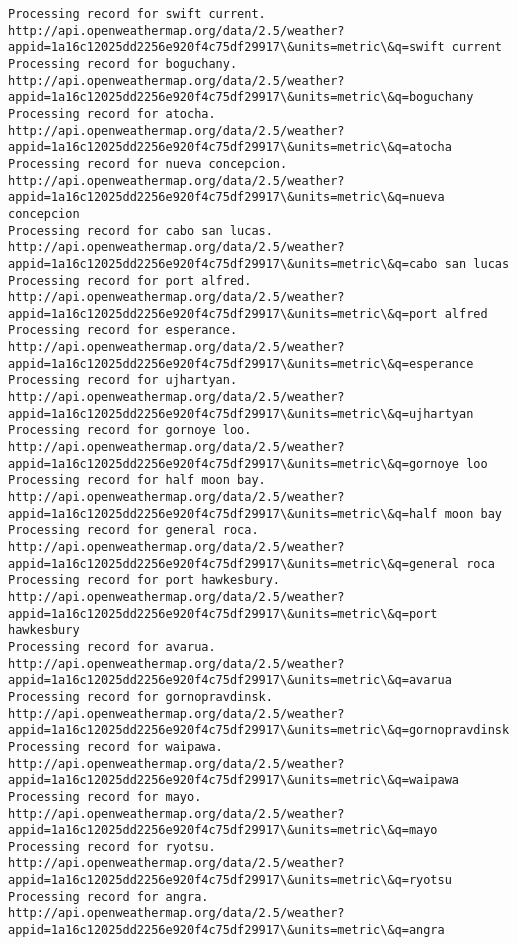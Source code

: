 \documentclass[11pt]{article}
\begin{document}
\begin{Verbatim}[commandchars=\\\{\}]
Processing record for swift current.
http://api.openweathermap.org/data/2.5/weather?appid=1a16c12025dd2256e920f4c75df29917\&units=metric\&q=swift current
Processing record for boguchany.
http://api.openweathermap.org/data/2.5/weather?appid=1a16c12025dd2256e920f4c75df29917\&units=metric\&q=boguchany
Processing record for atocha.
http://api.openweathermap.org/data/2.5/weather?appid=1a16c12025dd2256e920f4c75df29917\&units=metric\&q=atocha
Processing record for nueva concepcion.
http://api.openweathermap.org/data/2.5/weather?appid=1a16c12025dd2256e920f4c75df29917\&units=metric\&q=nueva concepcion
Processing record for cabo san lucas.
http://api.openweathermap.org/data/2.5/weather?appid=1a16c12025dd2256e920f4c75df29917\&units=metric\&q=cabo san lucas
Processing record for port alfred.
http://api.openweathermap.org/data/2.5/weather?appid=1a16c12025dd2256e920f4c75df29917\&units=metric\&q=port alfred
Processing record for esperance.
http://api.openweathermap.org/data/2.5/weather?appid=1a16c12025dd2256e920f4c75df29917\&units=metric\&q=esperance
Processing record for ujhartyan.
http://api.openweathermap.org/data/2.5/weather?appid=1a16c12025dd2256e920f4c75df29917\&units=metric\&q=ujhartyan
Processing record for gornoye loo.
http://api.openweathermap.org/data/2.5/weather?appid=1a16c12025dd2256e920f4c75df29917\&units=metric\&q=gornoye loo
Processing record for half moon bay.
http://api.openweathermap.org/data/2.5/weather?appid=1a16c12025dd2256e920f4c75df29917\&units=metric\&q=half moon bay
Processing record for general roca.
http://api.openweathermap.org/data/2.5/weather?appid=1a16c12025dd2256e920f4c75df29917\&units=metric\&q=general roca
Processing record for port hawkesbury.
http://api.openweathermap.org/data/2.5/weather?appid=1a16c12025dd2256e920f4c75df29917\&units=metric\&q=port hawkesbury
Processing record for avarua.
http://api.openweathermap.org/data/2.5/weather?appid=1a16c12025dd2256e920f4c75df29917\&units=metric\&q=avarua
Processing record for gornopravdinsk.
http://api.openweathermap.org/data/2.5/weather?appid=1a16c12025dd2256e920f4c75df29917\&units=metric\&q=gornopravdinsk
Processing record for waipawa.
http://api.openweathermap.org/data/2.5/weather?appid=1a16c12025dd2256e920f4c75df29917\&units=metric\&q=waipawa
Processing record for mayo.
http://api.openweathermap.org/data/2.5/weather?appid=1a16c12025dd2256e920f4c75df29917\&units=metric\&q=mayo
Processing record for ryotsu.
http://api.openweathermap.org/data/2.5/weather?appid=1a16c12025dd2256e920f4c75df29917\&units=metric\&q=ryotsu
Processing record for angra.
http://api.openweathermap.org/data/2.5/weather?appid=1a16c12025dd2256e920f4c75df29917\&units=metric\&q=angra

\end{Verbatim}
\end{document}
